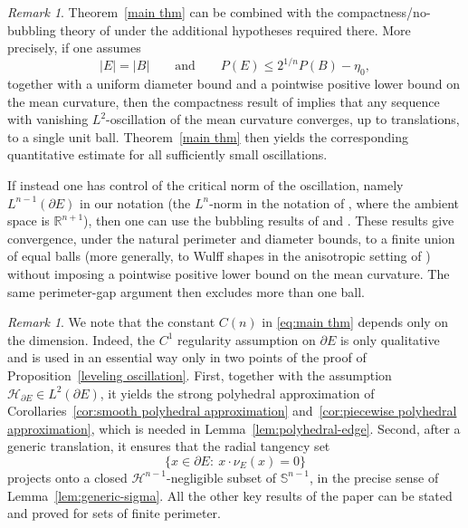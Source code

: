\documentclass[reqno,11pt]{amsart}
\makeatletter
\newcommand{\R}{\mathbb R}
\numberwithin{equation}{section}
\theoremstyle{remark}
\newtheorem{rem}[thm]{Remark}%
\makeatother
\begin{document}
\begin{rem}\label{rem:perimeter-gap}
Theorem~\ref{main thm} can be combined with the compactness/no-bubbling theory of \cite{DMMN2018} under the additional hypotheses required there. More precisely, if one assumes
$$
|E|=|B|\qquad \text{and}\qquad P(E)\le 2^{1/n}P(B)-\eta_0,
$$
together with a uniform diameter bound and a pointwise positive lower bound on the mean curvature, then the compactness result of \cite{DMMN2018} implies that any sequence with vanishing $L^2$-oscillation of the mean curvature converges, up to translations, to a single unit ball. Theorem~\ref{main thm} then yields the corresponding quantitative estimate for all sufficiently small oscillations. 

If instead one has control of the critical norm of the oscillation, namely
$L^{n-1}(\partial E)$ in our notation (the $L^n$-norm in the notation of
\cite{JN2023,Santilli2026}, where the ambient space is $\R^{n+1}$), then one can
use the bubbling results of \cite{JN2023} and 
\cite{Santilli2026}. These results give convergence, under the natural perimeter
and diameter bounds, to a finite union of equal balls (more generally, to Wulff
shapes in the anisotropic setting of \cite{Santilli2026}) without imposing a
pointwise positive lower bound on the mean curvature. The same perimeter-gap
argument then excludes more than one ball.
\end{rem}

 

\begin{rem}\label{rem:beyond smooth}
We note that the constant $C(n)$ in \eqref{eq:main thm} depends only on the dimension. Indeed, the $C^1$ regularity assumption on $\partial E$ is only qualitative and is used in an essential way only in two points of the proof of Proposition~\ref{leveling oscillation}. First, together with the assumption $\mathcal H_{\partial E}\in L^2(\partial E)$, it yields the strong polyhedral approximation of Corollaries~\ref{cor:smooth polyhedral approximation} and~\ref{cor:piecewise polyhedral approximation}, which is needed in Lemma~\ref{lem:polyhedral-edge}. Second, after a generic translation, it ensures that the radial tangency set
$$
\{x\in \partial E:\ x\cdot\nu_E(x)=0\}
$$
projects onto a closed $\mathscr H^{n-1}$-negligible subset of $\mathbb S^{n-1}$, in the precise sense of Lemma~\ref{lem:generic-sigma}. All the other key results of the paper can be stated and proved for sets of finite perimeter.
\end{rem}
\end{document}
